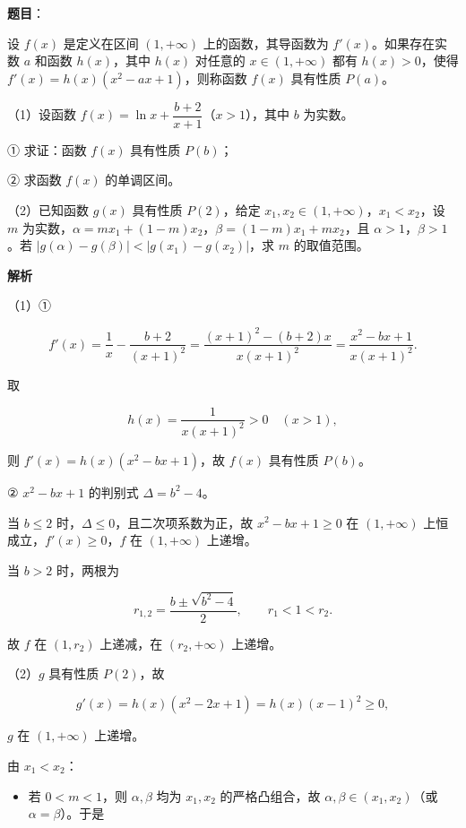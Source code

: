 \begin{answer}

\textbf{题目}：

设 $f(x)$ 是定义在区间 $(1,+\infty)$ 上的函数，其导函数为 $f'(x)$。如果存在实数 $a$ 和函数 $h(x)$，其中 $h(x)$ 对任意的 $x\in(1,+\infty)$ 都有 $h(x)>0$，使得 $f'(x)=h(x)(x^2-ax+1)$，则称函数 $f(x)$ 具有性质 $P(a)$。

（1）设函数 $f(x)=\ln x+\dfrac{b+2}{x+1}$（$x>1$），其中 $b$ 为实数。

① 求证：函数 $f(x)$ 具有性质 $P(b)$；

② 求函数 $f(x)$ 的单调区间。

（2）已知函数 $g(x)$ 具有性质 $P(2)$，给定 $x_1,x_2\in(1,+\infty)$，$x_1<x_2$，设 $m$ 为实数，$\alpha=mx_1+(1-m)x_2$，$\beta=(1-m)x_1+mx_2$，且 $\alpha>1$，$\beta>1$。若 $|g(\alpha)-g(\beta)|<|g(x_1)-g(x_2)|$，求 $m$ 的取值范围。

\textbf{解析}

（1）①

\nopagebreak[4]
\[f'(x)=\frac1x-\frac{b+2}{(x+1)^2}
=\frac{(x+1)^2-(b+2)x}{x(x+1)^2}
=\frac{x^2-bx+1}{x(x+1)^2}.\]

取

\nopagebreak[4]
\[h(x)=\frac1{x(x+1)^2}>0\quad(x>1),\]

则 $f'(x)=h(x)(x^2-bx+1)$，故 $f(x)$ 具有性质 $P(b)$。

② $x^2-bx+1$ 的判别式 $\Delta=b^2-4$。

当 $b\leqslant2$ 时，$\Delta\leqslant0$，且二次项系数为正，故 $x^2-bx+1\geqslant0$ 在 $(1,+\infty)$ 上恒成立，$f'(x)\geqslant0$，$f$ 在 $(1,+\infty)$ 上递增。

当 $b>2$ 时，两根为

\nopagebreak[4]
\[r_{1,2}=\frac{b\pm\sqrt{b^2-4}}2,\qquad r_1<1<r_2.\]

故 $f$ 在 $(1,r_2)$ 上递减，在 $(r_2,+\infty)$ 上递增。

（2）$g$ 具有性质 $P(2)$，故

\nopagebreak[4]
\[g'(x)=h(x)(x^2-2x+1)=h(x)(x-1)^2\geqslant0,\]

$g$ 在 $(1,+\infty)$ 上递增。

由 $x_1<x_2$：

\begin{itemize}
\item 若 $0<m<1$，则 $\alpha,\beta$ 均为 $x_1,x_2$ 的严格凸组合，故 $\alpha,\beta\in(x_1,x_2)$（或 $\alpha=\beta$）。于是
\end{itemize}


\end{answer}
